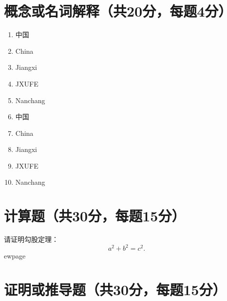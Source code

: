 \documentclass[fontset=fandol]{ctexart}
\begin{document}
\section{概念或名词解释（共20分，每题4分）}
\begin{enumerate}
    \item 中国
    \item China
    \item Jiangxi
    \item JXUFE
    \item Nanchang
    \item 中国
    \item China
    \item Jiangxi
    \item JXUFE
    \item Nanchang
\end{enumerate}

\section{计算题（共30分，每题15分）}
请证明勾股定理：
$$
a^2 + b^2 = c^2.
$$
%
ewpage



\section{证明或推导题（共30分，每题15分）}
\end{document}
